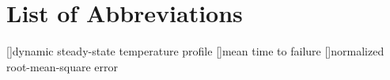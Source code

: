 \chapter*{List of Abbreviations}

\begin{acronym}[NRMSE]
[]{dynamic steady-state temperature profile}
[]{mean time to failure}
[]{normalized root-mean-square error}
\end{acronym}
